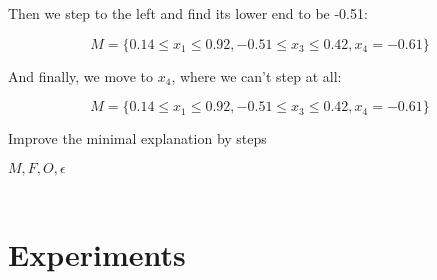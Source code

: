 \documentclass[12pt]{article}
\begin{document}
Then we step to the left and find its lower end to be -0.51:

\[
M = \{0.14 \le x_1 \le 0.92,
      -0.51 \le x_3 \le 0.42,
      x_4 = -0.61\}
\]

And finally, we move to $x_4$, where we can't step at all:

\[
M = \{0.14 \le x_1 \le 0.92,
      -0.51 \le x_3 \le 0.42,
      x_4 = -0.61\}
\]




\begin{algorithm}
	\caption{Improve the minimal explanation by steps}
	\begin{algorithmic}
		 {$M, F, O, \epsilon$}
				\EndWhile
				\\
				\EndWhile
			\EndFor
			\\
		\EndProcedure
	\end{algorithmic}
\end{algorithm}



\section{Experiments}




\end{document}
